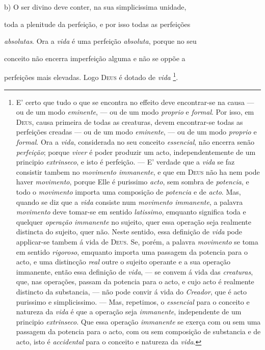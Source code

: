  b) O ser divino deve conter, na sua simplicissima unidade,

toda a plenitude da perfeição, e por isso todas as perfeições

\emph{absolutas}. Ora a \emph{vida} é uma perfeição \emph{absoluta}, porque no seu

conceito não encerra imperfeição alguma e não se oppõe a

perfeições mais elevadas. Logo \textsc{Deus} é dotado de \emph{vida} \footnote{E' certo que tudo o que se encontra no effeito deve encontrar-se na causa --- ou de um modo \emph{eminente}, --- ou de um modo \emph{proprio} e \emph{formal}. Por isso, em \textsc{Deus}, causa primeira de todas as creaturas, devem encontrar-se todas as perfeições creadas --- ou de um modo \emph{eminente}, --- ou de um modo \emph{proprio} e \emph{formal}. Ora a \emph{vida}, considerada no seu conceito \emph{essencial}, não encerra senão \emph{perfeição}; porque \emph{viver} é poder produzir um acto, independentemente de um principio \emph{extrinseco}, e isto é perfeição. --- E' verdade que a \emph{vida} se faz consistir tambem no \emph{movimento immanente}, e que em \textsc{Deus} não ha nem pode haver \emph{movimento}, porque Elle é purissimo \emph{acto}, sem sombra de \emph{potencia}, e todo o \emph{movimento} importa uma composição de \emph{potencia} e de \emph{acto}. Mas, quando se diz que a \emph{vida} consiste num \emph{movimento immanente}, a palavra \emph{movimento} deve tomar-se em sentido \emph{latissimo}, emquanto significa toda e quelquer \emph{operação immanente} no sujeito, quer essa operação seja realmente distincta do sujeito, quer não. Neste sentido, essa definição de \emph{vida} pode applicar-se tambem á vida de \textsc{Deus}. Se, porém, a palavra \emph{movimento} se toma em sentido \emph{rigoroso}, emquanto importa uma passagem da potencia para o acto, e uma distincção \emph{real} outre o sujeito operante e a sua operação immanente, então essa definição de \emph{vida}, --- se convem á vida das \emph{creaturas}, que, nas operações, passam da potencia para o acto, e cujo acto é realmente distincto da substancia, --- não pode convir á vida do \emph{Creador}, que é acto purissimo e simplicissimo. --- Mas, repetimos, o \emph{essencial} para o conceito e natureza da \emph{vida} é que a operação seja \emph{immanente}, independente de um principio \emph{extrinseco}. Que essa operação \emph{immanente} se exerça com ou sem uma passagem da potencia para o acto, com ou sem composição de substancia e de acto, isto é \emph{accidental} para o conceito e natureza da \emph{vida}.}.

